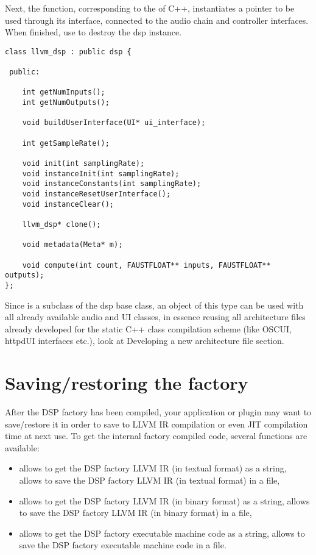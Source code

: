 Next, the  function, corresponding to the  of C++, instantiates a  pointer to be used through its interface, connected to the audio chain and controller interfaces. When finished, use  to destroy the dsp instance.

\begin{lstlisting}
class llvm_dsp : public dsp {
    
 public:
    
    int getNumInputs();    
    int getNumOutputs();
    
    void buildUserInterface(UI* ui_interface);
   
    int getSampleRate();
    
    void init(int samplingRate);  
    void instanceInit(int samplingRate);
    void instanceConstants(int samplingRate);
    void instanceResetUserInterface();  
    void instanceClear();
    
    llvm_dsp* clone();
    
    void metadata(Meta* m);
    
    void compute(int count, FAUSTFLOAT** inputs, FAUSTFLOAT** outputs);
};
\end{lstlisting}

Since  is a subclass of the dsp base class, an object of this type can be used with all already available audio and UI classes, in essence reusing all architecture files already developed for the static C++ class compilation scheme (like OSCUI, httpdUI interfaces etc.), look at Developing a new architecture file section.

\section{Saving/restoring the factory}

After the DSP factory has been compiled, your application or plugin may want to save/restore it in order to save \faust to LLVM IR compilation or even JIT compilation time at next use. To get the internal factory compiled code, several functions are available:

\begin{itemize}
\item  {} allows to get the DSP factory LLVM IR (in textual format) as a string,  allows to save the DSP factory LLVM IR (in textual format) in a file,
\item  {} allows to get the DSP factory LLVM IR (in binary format) as a string,  allows to save the DSP factory LLVM IR (in binary format) in a file,
\item  {} allows to get the DSP factory executable machine code as a string,  allows to save the DSP factory executable machine code in a file.
\end{itemize}

